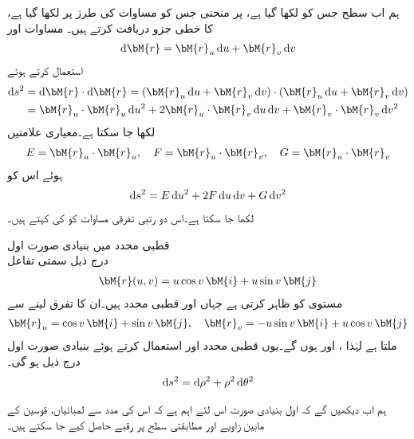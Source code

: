 ہم اب سطح  جس کو  لکھا گیا ہے، پر منحنی  جس کو مساوات  کی طرز پر لکھا گیا ہے،  کا خطی جزو دریافت کرتے ہیں۔ مساوات  اور
\begin{align*}
\dif \bM{r}=\bM{r}_u\dif u+\bM{r}_v\dif v
\end{align*}
استعمال کرتے ہوئے
\begin{align*}
\dif s^2&=\dif \bM{r}\cdot \dif \bM{r}=(\bM{r}_u\dif u+\bM{r}_v\dif v)\cdot (\bM{r}_u\dif u+\bM{r}_v\dif v)\\
&=\bM{r}_u\cdot \bM{r}_u \dif u^2+2\bM{r}_u\cdot \bM{r}_v\dif u\dif v+\bM{r}_v\cdot \bM{r}_v\dif v^2
\end{align*}
لکھا جا سکتا ہے۔معیاری علامتیں
\begin{align}\label{مساوات_خطی_تکمل_پہلی_بنیادی_صورت_الف}
E=\bM{r}_u\cdot \bM{r}_u,\quad F=\bM{r}_u\cdot \bM{r}_v,\quad G=\bM{r}_u\cdot \bM{r}_v
\end{align}
ہوئے اس کو 
\begin{align}\label{مساوات_خطی_تکمل_پہلی_بنیادی_صورت_ب}
\dif s^2=E\dif u^2+2F\dif u\dif v+G\dif v^2
\end{align}
لکھا جا سکتا ہے۔اس دو رتبی تفرقی مساوات کو  کی  کہتے ہیں۔

\quad قطبی محدد میں بنیادی صورت اول\\
درج ذیل سمتی تفاعل
\begin{align*}
\bM{r}(u,v)=u\cos v\,\bM{i}+u\sin v\,\bM{j}
\end{align*}
 مستوی کو ظاہر کرتی ہے جہاں  اور  قطبی محدد ہیں۔ان کا تفرق لینے سے 
\begin{align*}
\bM{r}_u=\cos v\,\bM{i}+\sin v\,\bM{j},\quad \bM{r}_v=-u\sin v\,\bM{i}+u\cos v \,\bM{j}
\end{align*}
ملتا ہے لہٰذا ،  اور ہوں گے۔یوں قطبی محدد  اور  استعمال کرتے ہوئے بنیادی صورت اول درج ذیل ہو گی۔
\begin{align}\label{مساوات_خطی_تکمل_پہلی_بنیادی_صورت_پ}
\dif s^2=\dif \rho^2+\rho^2\dif \theta^2
\end{align}

ہم اب دیکھیں گے کہ اول بنیادی صورت اس لئے اہم ہے کہ اس کی مدد سے لمبائیاں، قوسین کے مابین زاویے اور مطابقتی سطح  پر رقبے حاصل کیے جا سکتے ہیں۔

